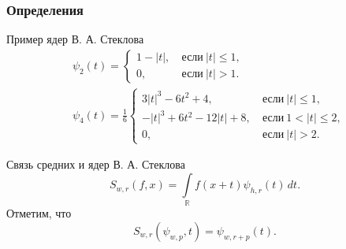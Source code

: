 \documentclass[pdf, 9pt, unicode]{beamer} %
\renewcommand{\alert}[1]{{\usebeamercolor[fg]{bluetext_color}#1}}
\begin{document}
\begin{frame}
\frametitle{Определения}

\begin{block} {Пример ядер В. А. Стеклова}
     \begin{align*}
        &\psi_{2}(t)=
        \begin{cases}
          1-|t|,
          &\ \text{если}\ |t|\leqslant 1,\\
          0,&\ \text{если}\ |t| > 1.
        \end{cases}
        \\
        &\psi_{4}(t)=\frac{1}{6}
        \begin{cases}
          3|t|^3-6t^2+4,
          &\ \text{если}\ |t|\leqslant 1,\\
          -|t|^3+6t^2-12|t|+8,
          &\ \text{если}\ 1<|t|\leqslant 2,\\
          0,&\ \text{если}\ |t| > 2.
        \end{cases}
      \end{align*}
\end{block}


\begin{block}{Связь средних и ядер В. А. Стеклова}
$$
S_{w,r}(f,x)=\int\limits_{\mathbb R} f(x+t)\psi_{h,r}(t)\,dt.
$$
Отметим, что
$$
S_{w,r}(\psi_{w,p},t) = \psi_{w,r+p}(t).
$$
\end{block}

\end{frame}
\end{document}
